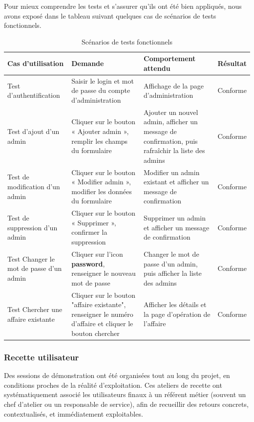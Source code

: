 \documentclass[11pt,a4paper]{article}
\begin{document}
 Pour mieux comprendre les tests et s'assurer qu'ils ont été bien appliqués, nous avons exposé dans le tableau suivant quelques cas de scénarios de tests fonctionnels.
 
 \begin{table}[H]
\centering
\renewcommand{\arraystretch}{1.4}
\begin{tabular}{|p{4cm}|p{4.5cm}|p{5.5cm}|p{2cm}|}
\hline
\textbf{Cas d’utilisation} & \textbf{Demande} & \textbf{Comportement attendu} & \textbf{Résultat} \\
\hline
Test d’authentification & Saisir le login et mot de passe du compte d’administration & Affichage de la page d’administration & Conforme \\
\hline
Test d’ajout d’un admin & Cliquer sur le bouton « Ajouter admin », remplir les champs du formulaire & Ajouter un nouvel admin, afficher un message de confirmation, puis rafraîchir la liste des admins & Conforme \\
\hline
Test de modification d’un admin & Cliquer sur le bouton « Modifier admin », modifier les données du formulaire & Modifier un admin existant et afficher un message de confirmation & Conforme \\
\hline
Test de suppression d’un admin & Cliquer sur le bouton « Supprimer », confirmer la suppression & Supprimer un admin et afficher un message de confirmation & Conforme \\
\hline
Test Changer le mot de passe d'un admin & Cliquer sur l'icon \textbf{password}, renseigner le nouveau mot de passe & Changer le mot de passe d'un admin, puis afficher la liste des admins & Conforme \\
\hline
Test Chercher une affaire existante & Cliquer sur le bouton "affaire existante", renseigner le numéro d'affaire et cliquer le bouton chercher & Afficher les détails et la page d'opération de l'affaire & Conforme \\
\hline
\end{tabular}
\caption{Scénarios de tests fonctionnels}
\end{table}

\subsubsection{Recette utilisateur}

Des sessions de démonstration ont été organisées tout au long du projet, en conditions proches de la réalité d’exploitation. Ces ateliers de recette ont systématiquement associé les utilisateurs finaux à un référent métier (souvent un chef d’atelier ou un responsable de service), afin de recueillir des retours concrets, contextualisés, et immédiatement exploitables.
\end{document}
